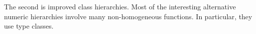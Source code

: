 \documentclass[preprint]{sigplanconf}
\theoremstyle{definition}
\begin{document}
The second is improved class hierarchies.
Most of the interesting alternative numeric hierarchies involve many non-homogeneous functions.
In particular, they use type classes.



%
%
%
%




\end{document}
